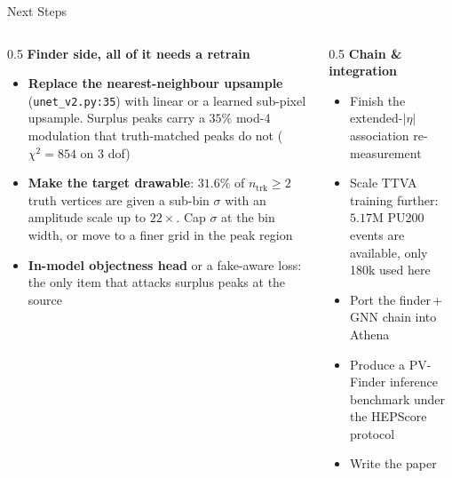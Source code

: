 \documentclass[xcolor=table,aspectratio=169]{beamer}
\newcommand{\ntrk}{\ensuremath{n_\mathrm{trk}}}
\begin{document}
\begin{frame}[shrink=15]{Next Steps}
    \begin{columns}[t]
        \begin{column}{0.5\linewidth}
            \textbf{Finder side, all of it needs a retrain}
            \begin{itemize}
                \setlength\itemsep{0.4em}
                \item \textbf{Replace the nearest-neighbour upsample}
                    (\texttt{unet\_v2.py:35}) with linear or a learned sub-pixel
                    upsample. Surplus peaks carry a $35\%$ mod-4 modulation that
                    truth-matched peaks do not ($\chi^2 = 854$ on 3 dof)
                \item \textbf{Make the target drawable}: $31.6\%$ of $\ntrk\geq2$
                    truth vertices are given a sub-bin $\sigma$ with an amplitude
                    scale up to $22\times$. Cap $\sigma$ at the bin width, or move to
                    a finer grid in the peak region
                \item \textbf{In-model objectness head} or a fake-aware loss: the only
                    item that attacks surplus peaks at the source
            \end{itemize}
        \end{column}
        \begin{column}{0.5\linewidth}
            \textbf{Chain \& integration}
            \begin{itemize}
                \setlength\itemsep{0.5em}
                \item Finish the extended-$|\eta|$ association re-measurement
                \item Scale TTVA training further: $5.17$M PU200 events are available, only 180k used here
                \item Port the finder\,+\,GNN chain into Athena
                \item Produce a PV-Finder inference benchmark under the HEPScore protocol
                \item Write the paper
            \end{itemize}
        \end{column}
    \end{columns}
\end{frame}
\end{document}
